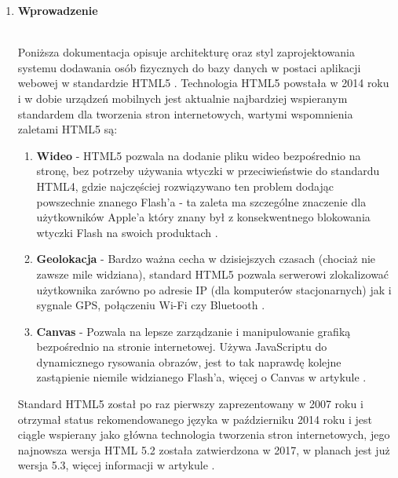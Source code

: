 \documentclass[a4paper,11pt]{article}
\begin{document}
\begin{enumerate}[leftmargin=0pt]

    \item \textbf{{\Large Wprowadzenie}}\\ \\
		\begin{large}
		\hspace*{1cm}
		Poniższa dokumentacja opisuje architekturę oraz styl zaprojektowania systemu dodawania osób fizycznych do bazy danych w postaci aplikacji webowej w standardzie HTML5 \cite{hoy2011html5}.  Technologia HTML5 powstała w 2014 roku i w dobie urządzeń mobilnych jest aktualnie najbardziej wspieranym standardem dla tworzenia stron internetowych, wartymi wspomnienia zaletami HTML5 są:
			\begin{enumerate}
				\item \textbf{Wideo} - HTML5 pozwala na dodanie pliku wideo bezpośrednio na stronę, bez potrzeby używania wtyczki w przeciwieństwie do standardu HTML4, gdzie najczęściej rozwiązywano ten problem dodając powszechnie znanego Flash'a - ta zaleta ma szczególne znaczenie dla użytkowników Apple'a który znany był z konsekwentnego blokowania wtyczki Flash na swoich produktach \cite{johnson2015flash}.
				
				\item \textbf{Geolokacja} - Bardzo ważna cecha w dzisiejszych czasach (chociaż nie zawsze mile widziana), standard HTML5 pozwala serwerowi zlokalizować użytkownika zarówno po adresie IP (dla komputerów stacjonarnych) jak i sygnale GPS, połączeniu Wi-Fi czy Bluetooth \cite{holdener2011html5}.
				
				\item \textbf{Canvas} - Pozwala na lepsze zarządzanie i manipulowanie grafiką bezpośrednio na stronie internetowej. Używa JavaScriptu do dynamicznego rysowania obrazów, jest to tak naprawdę kolejne zastąpienie niemile widzianego Flash'a, więcej o Canvas w artykule \cite{Canvas}.
			\end{enumerate}
		\vspace{1cm}			
		Standard HTML5 został po raz pierwszy zaprezentowany w 2007 roku i otrzymał status rekomendowanego języka w październiku 2014 roku i jest ciągle wspierany jako główna technologia tworzenia stron internetowych, jego najnowsza wersja HTML 5.2 została zatwierdzona w 2017, w planach jest już wersja 5.3, więcej informacji w artykule \cite{html53}.
		
		
		\end{large}


\end{enumerate}
\end{document}
